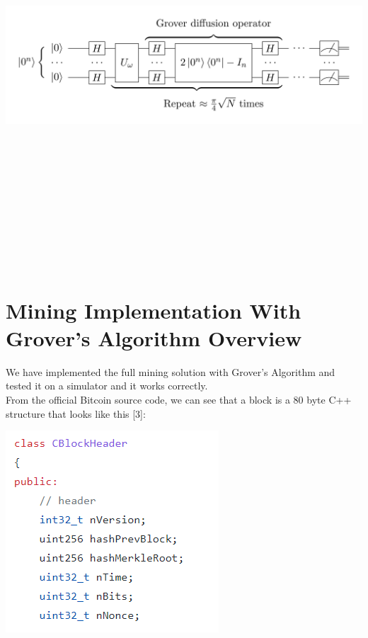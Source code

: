 \documentclass[11pt]{article} %
\begin{document}
\noindent \includegraphics[keepaspectratio, width=15cm, height=15cm]{grover-circuit}

\section{Mining Implementation With Grover's Algorithm Overview}{}
We have implemented the full mining solution with Grover's Algorithm and tested it on a simulator and it works correctly. \\

\noindent From the official Bitcoin source code, we can see that a block is a 80 byte C++ structure that looks like this [3]:

\includegraphics{block}
\end{document}
